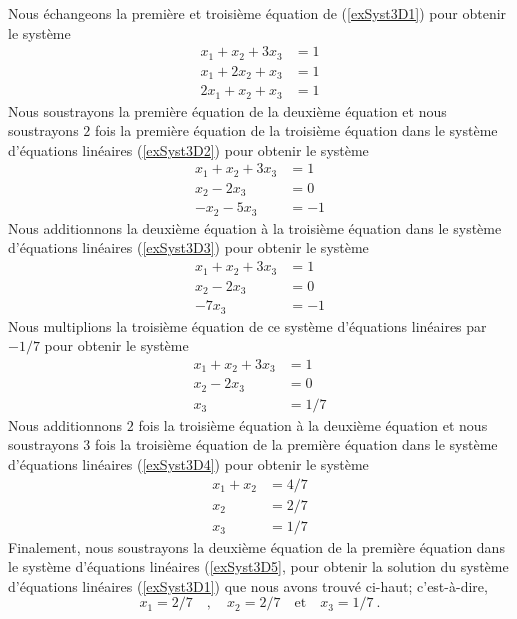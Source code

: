 {\begin{egg}
Nous échangeons la première et troisième équation de (\ref{exSyst3D1}) pour
obtenir le système
\begin{equation}\label{exSyst3D2}
\begin{split}
x_1 + x_2 + 3x_3 &= 1\\
x_1 + 2x_2 + x_3 &= 1\\
2x_1 + x_2 + x_3 &= 1
\end{split}
\end{equation}
Nous soustrayons la première équation de la deuxième équation et nous
soustrayons $2$ fois la première équation de la troisième équation
dans le système d'équations linéaires (\ref{exSyst3D2}) pour obtenir
le système
\begin{equation}\label{exSyst3D3}
\begin{split}
x_1 + x_2 + 3x_3 &= 1\\
x_2 - 2x_3 &= 0\\
-x_2 - 5x_3 &= -1
\end{split}
\end{equation}
Nous additionnons la deuxième équation à la troisième équation dans le
système d'équations linéaires (\ref{exSyst3D3}) pour obtenir le système
\[
\begin{split}
x_1 + x_2 + 3x_3 &= 1\\
x_2 - 2x_3 &= 0\\
- 7x_3 &= -1
\end{split}
\]
Nous multiplions la troisième équation de ce système d'équations
linéaires par $-1/7$ pour obtenir le système
\begin{equation}\label{exSyst3D4}
\begin{split}
x_1 + x_2 + 3x_3 &= 1\\
x_2 - 2x_3 &= 0 \\
x_3 &= 1/7
\end{split}
\end{equation}
Nous additionnons
$2$ fois la troisième équation à la deuxième équation et nous soustrayons
$3$ fois la troisième équation de la première équation dans le système
d'équations linéaires (\ref{exSyst3D4}) pour obtenir le système
\begin{equation}\label{exSyst3D5}
\begin{split}
x_1 + x_2 &= 4/7\\
x_2 &= 2/7 \\
x_3 &= 1/7
\end{split}
\end{equation}
Finalement, nous soustrayons la deuxième équation de la première équation
dans le système d'équations linéaires (\ref{exSyst3D5}, pour obtenir
la solution du système d'équations linéaires (\ref{exSyst3D1}) que
nous avons trouvé ci-haut; c'est-à-dire,
\[
x_1 = 2/7\quad , \quad x_2 = 2/7 \quad \text{et} \quad
x_3 = 1/7 \ .
\]
\end{egg}

}
